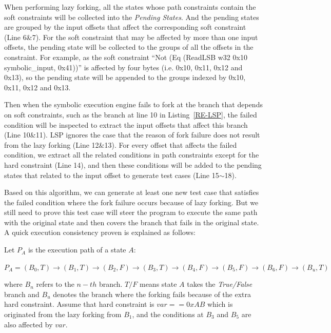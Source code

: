 When performing lazy forking, all the states whose path constraints contain the soft constraints will be collected into the \emph{Pending States}. And the pending states are grouped by the input offsets that affect the corresponding soft constraint (Line 6\&7). For the soft constraint that may be affected by more than one input offsets, the pending state will be collected to the groups of all the offsets in the constraint. For example, as the soft constraint ``Not (Eq (ReadLSB w32 0x10 symbolic\_input, 0x41))'' is affected by four bytes (i.e. 0x10, 0x11, 0x12 and 0x13), so the pending state will be appended to the groups indexed by 0x10, 0x11, 0x12 and 0x13. 

Then when the symbolic execution engine fails to fork at the branch that depends on soft constraints, such as the branch at line 10 in Listing~\ref{RE-LSP}, the failed condition will be inspected to extract the input offsets that affect this branch (Line 10\&11). LSP ignores the case that the reason of fork failure does not result from the lazy forking (Line 12\&13). For every offset that affects the failed condition, we extract all the related conditions in path constraints except for the hard constraint (Line 14), and then these conditions will be added to the pending states that related to the input offset to generate test cases (Line 15$\sim$18). 


Based on this algorithm, we can generate at least one new test case that satisfies the failed condition where the fork failure occurs because of lazy forking. But we still need to prove this test case will steer the program to execute the same path with the original state and then covers the branch that fails in the original state. A quick execution consistency proven is explained as follows:

Let $P_A$ is the execution path of a state $A$:
\begin{center}
$P_A = (B_0,T) \rightarrow (B_1,T) \rightarrow (B_2,F) \rightarrow (B_3,T)
\rightarrow (B_4,F) \rightarrow (B_5,F) \rightarrow (B_6,F) \rightarrow (B_u,T)$
\end{center}

\noindent where $B_n$ refers to the $n-th$ branch. $T/F$ means state $A$ takes the \emph{True/False} branch and $B_u$ denotes the branch where the forking fails because of the extra hard constraint. Assume that hard constraint is $var==0xAB$ which is originated from the lazy forking from $B_1$, and the conditions at $B_3$ and $B_5$ are also affected by $var$.

